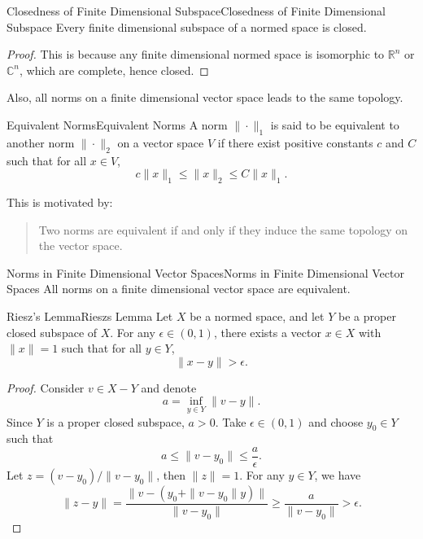 \documentclass[../main.tex]{subfiles}
\begin{document}
\begin{theorem}{Closedness of Finite Dimensional Subspace}{Closedness of Finite Dimensional Subspace}
	Every finite dimensional subspace of a normed space is closed.
\end{theorem}
\begin{proof}
	This is because any finite dimensional normed space is isomorphic to $\mathbb{R}^n$ or $\mathbb{C}^n$, which are complete, hence closed.
\end{proof}

Also, all norms on a finite dimensional vector space leads to the same topology.

\begin{definition}{Equivalent Norms}{Equivalent Norms}
	A norm $\|\cdot\|_1$ is said to be equivalent to another norm $\|\cdot\|_2$ on a vector space $V$ if there exist positive constants $c$ and $C$ such that for all $x \in V$,
	\begin{equation*}
		c \|x\|_1 \leq \|x\|_2 \leq C \|x\|_1.
	\end{equation*}
\end{definition}
This is motivated by:
\begin{quote}
	Two norms are equivalent if and only if they induce the same topology on the vector space.
\end{quote}

\begin{theorem}{Norms in Finite Dimensional Vector Spaces}{Norms in Finite Dimensional Vector Spaces}
	All norms on a finite dimensional vector space are equivalent.
\end{theorem}

\begin{theorem}{Riesz's Lemma}{Rieszs Lemma}
	Let $X$ be a normed space, and let $Y$ be a proper closed subspace of $X$. For any $\epsilon \in (0, 1)$, there exists a vector $x \in X$ with $\|x\| = 1$ such that for all $y \in Y$,
	\begin{equation*}
		\|x - y\| > \epsilon.
	\end{equation*}
\end{theorem}
\begin{proof}
	Consider $v\in X-Y$ and denote
	\begin{equation*}
		a = \inf_{y\in Y} \|v - y\|.
	\end{equation*}
	Since $Y$ is a proper closed subspace, $a > 0$. Take $\epsilon\in (0,1)$ and choose $y_0\in Y$ such that
	\begin{equation*}
		a\leq \|v - y_0\| \leq \frac{a}{\epsilon}.
	\end{equation*}
	Let $z = (v - y_0)/\|v - y_0\|$, then $\|z\| = 1$. For any $y\in Y$, we have
	\begin{equation*}
		\|z - y\| = \frac{\|v - (y_0 + \|v - y_0\| y)\|}{\|v - y_0\|} \geq \frac{a}{\|v - y_0\|} > \epsilon.
	\end{equation*}
\end{proof}
\end{document}
